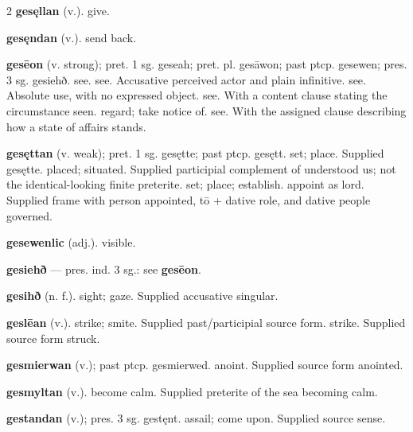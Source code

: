 \begin{multicols*}{2}
\textbf{gesęllan} (v.). give.\par
\textbf{gesęndan} (v.). send back.\par
\textbf{gesēon} (v. strong); pret. 1 sg. geseah; pret. pl. gesāwon; past ptcp. gesewen; pres. 3 sg. gesiehð. see. see. Accusative perceived actor and plain infinitive. see. Absolute use, with no expressed object. see. With a content clause stating the circumstance seen. regard; take notice of. see. With the assigned clause describing how a state of affairs stands.\par
\textbf{gesęttan} (v. weak); pret. 1 sg. gesętte; past ptcp. gesętt. set; place. Supplied gesętte. placed; situated. Supplied participial complement of understood us; not the identical-looking finite preterite. set; place; establish. appoint as lord. Supplied frame with person appointed, tō + dative role, and dative people governed.\par
\textbf{gesewenlic} (adj.). visible.\par
\textbf{gesiehð} — pres. ind. 3 sg.: see \textbf{gesēon}.\par
\textbf{gesihð} (n. f.). sight; gaze. Supplied accusative singular.\par
\textbf{geslēan} (v.). strike; smite. Supplied past/participial source form. strike. Supplied source form struck.\par
\textbf{gesmierwan} (v.); past ptcp. gesmierwed. anoint. Supplied source form anointed.\par
\textbf{gesmyltan} (v.). become calm. Supplied preterite of the sea becoming calm.\par
\textbf{gestandan} (v.); pres. 3 sg. gestęnt. assail; come upon. Supplied source sense.\par

\end{multicols*}
